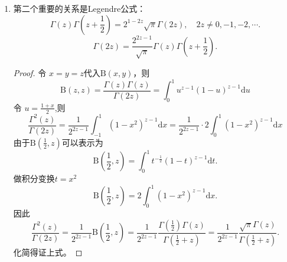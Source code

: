 \begin{property}
\begin{enumerate}[noitemsep]
\begin{enumerate}
			\begin{proof}
				由于
				$$\Gamma \left(1-z\right)\Gamma\left(z\right) = \mathrm{B}\left(1-z,z\right)\Gamma\left(1\right) = \int_{0}^{1}{x^{z-1}\left(1-x\right)^{-z}\mathrm{d}x}.$$
				由于 \url{https://dlmf.nist.gov/5.12}，因此得证第式(1)。
				$$\Gamma \left(1-z\right)\Gamma\left(z\right) = \int_{0}^{1}{x^{z-1}\left(1-x\right)^{-z}\mathrm{d}x} = \frac{\pi}{\sin {\left(\pi z\right)}}.$$
				而由于
				$$  \Gamma \left(\varepsilon -n\right) \Gamma \left(n+1-\varepsilon \right) = \frac{\pi}{\sin\left(\pi\left(\varepsilon-n\right)\right)} = \left(-1\right)^n\frac{\pi}{\sin\left(\pi \varepsilon\right)} $$
				$$
				\Gamma \left(-\varepsilon \right)\Gamma \left(1+\varepsilon \right) = \frac{\pi}{\sin\left(-\pi\varepsilon\right)} = -\frac{\pi}{\sin\left(\pi \varepsilon\right)}
				$$
				因此得证上式(2)。
				此外由于
				$$ \mathrm {B} (x,y) \cdot \mathrm {B} (x+y,1-y) = \frac{\Gamma\left(x\right)\Gamma\left(y\right)}{\Gamma\left(x+y\right)}\cdot \frac{\Gamma\left(x+y\right)\Gamma\left(1-y\right)}{\Gamma\left(x+1\right)} = \frac{\Gamma\left(y\right)\Gamma\left(1-y\right)}{x} = {\frac {\pi }{x\sin(\pi y)}}.
				$$
				因此得证上式(3)。
			\end{proof}
			
			\item 第二个重要的关系是Legendre公式：
			\begin{equation}
			\Gamma \left(z\right)\Gamma\left(z+\frac{1}{2}\right)=2^{1-2z}{\sqrt {\pi }}\Gamma\left(2z\right),\quad  2z \neq 0,-1,-2,\cdots.
			\end{equation}
			\begin{equation}
			 \Gamma\left(2z\right) = \frac{2^{2z-1}}{\sqrt {\pi }}\Gamma \left(z\right)\Gamma\left(z+\frac{1}{2}\right).
			\end{equation}			
			\begin{proof}
				令 $x = y = z$代入$ \mathrm {B} (x,y) $，则
				$$ \mathrm {B} (z,z) = \frac{\Gamma\left(z\right)\Gamma\left(z\right)}{\Gamma\left(2z\right)} = \int_{0}^{1}u^{z-1}\left(1-u\right)^{z-1}\mathrm{d}u$$ 
			令 $\displaystyle u= \frac{1+x}{2}$,则
			$$\frac{\Gamma^2\left(z\right)}{\Gamma\left(2z\right)} = \frac{1}{2^{2z-1}}\int_{-1}^{1}\left(1-x^2\right)^{z-1}\mathrm{d}x = \frac{1}{2^{2z-1}}\cdot 2 \int_{0}^{1}\left(1-x^2\right)^{z-1}\mathrm{d}x$$
			由于$\displaystyle \mathrm{B}\left(\frac{1}{2},z\right)$可以表示为
			$$\mathrm{B}\left(\frac{1}{2},z\right) = \int_{0}^{1}{t^{-\frac{1}{2}}\left(1-t\right)^{z-1}\mathrm{d}t}.$$
			做积分变换$t = x^2$
			$$\mathrm{B}\left(\frac{1}{2},z\right) = 2\int_{0}^{1}{\left(1-x^2\right)^{z-1}\mathrm{d}x}.$$
			因此	
			$$\frac{\Gamma^2\left(z\right)}{\Gamma\left(2z\right)} = \frac{1}{2^{2z-1}}\mathrm{B}\left(\frac{1}{2},z\right) 	= \frac{1}{2^{2z-1}}\frac{\Gamma\left(\frac{1}{2}\right)\Gamma\left(z\right)}{\Gamma\left(\frac{1}{2}+z\right)} = \frac{1}{2^{2z-1}}\frac{\sqrt{\pi}\Gamma\left(z\right)}{\Gamma\left(\frac{1}{2}+z\right)}. $$
			化简得证上式。
			\end{proof}
			

\end{enumerate}
\end{enumerate}
\end{property}
